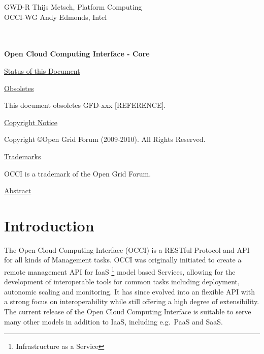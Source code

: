\documentclass[10pt,a4paper]{article}
\begin{document}
\thispagestyle{empty}

GWD-R \hfill  Thijs Metsch, Platform Computing\\
OCCI-WG \hfill  Andy Edmonds, Intel\\
\\
\\

\vspace*{0.5in}

\begin{Large}
\textbf{Open Cloud Computing Interface - Core}
\end{Large}

\vspace*{0.5in}

\underline{Status of this Document}



\underline{Obsoletes}

This document obsoletes GFD-xxx [REFERENCE].

\underline{Copyright Notice}

Copyright \copyright Open Grid Forum (2009-2010). All Rights Reserved.

\underline{Trademarks}

OCCI is a trademark of the Open Grid Forum.

\underline{Abstract}



\newpage
\tableofcontents
\newpage

\section{Introduction}
The Open Cloud Computing Interface (OCCI) is a RESTful Protocol and
API for all kinds of Management tasks. OCCI was originally initiated
to create a remote management API for IaaS%
\footnote{Infrastructure as a Service}
model based Services, allowing for the development of interoperable tools for
common tasks including deployment, autonomic scaling and monitoring.
%
It has since evolved into an flexible API with a strong focus on
interoperability while still offering a high degree of extensibility. The
current release of the Open Cloud Computing Interface is suitable to serve many
other models in addition to IaaS, including e.g.~PaaS and SaaS.
\end{document}
